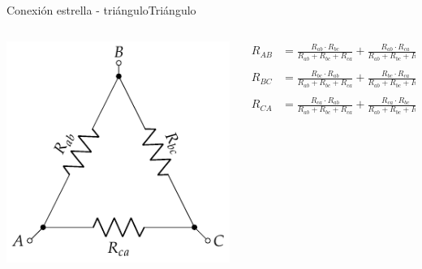 \documentclass[aspectratio=169, xcolor={usenames,svgnames,dvipsnames}]{beamer}
\begin{document}
\begin{frame}{Conexión estrella - triángulo}{Triángulo}
\begin{columns}
\begin{column}{0.5\columnwidth}
\begin{center}
\includegraphics[width=.9\linewidth]{../figs/Conexion_Triangulo.pdf}
\end{center}
\end{column}
\begin{column}{0.5\columnwidth}
\begin{align*}
  R_{AB} &= \frac{R_{ab} \cdot R_{bc}}{R_{ab} + R_{bc} + R_{ca}} + \frac{R_{ab} \cdot R_{ca}}{R_{ab} + R_{bc} + R_{ca}}\\
  \\
  R_{BC} &= \frac{R_{bc} \cdot R_{ab}}{R_{ab} + R_{bc} + R_{ca}} + \frac{R_{bc} \cdot R_{ca}}{R_{ab} + R_{bc} + R_{ca}}\\
  \\
  R_{CA} &= \frac{R_{ca} \cdot R_{ab}}{R_{ab} + R_{bc} + R_{ca}} + \frac{R_{ca} \cdot R_{bc}}{R_{ab} + R_{bc} + R_{ca}}
\end{align*}
\end{column}
\end{columns}
\end{frame}
\end{document}
